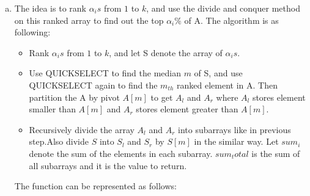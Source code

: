 \documentclass[11pt]{article}
\begin{document}
\begin{solution}
\begin{enumerate}[(a)]
    \item
    The idea is to rank $\alpha_is$ from $1$ to $k$, and use the divide and conquer method on this ranked array to find out the top $\alpha_i\%$ of A. The algorithm is as following:
    \begin{itemize}
        \item Rank $\alpha_is$ from $1$ to $k$, and let S denote the array of $\alpha_is$.
        \item Use QUICKSELECT to find the median $m$ of S, and use QUICKSELECT again to find the $m_{th}$ ranked element in A. Then partition the A by pivot $A[m]$ to get $A_l$ and $A_r$ where $A_l$ stores element smaller than $A[m]$ and $A_r$ stores element greater than $A[m]$.
        \item Recursively divide the array $A_l$ and $A_r$ into subarrays like in previous step.Also divide $S$ into $S_l$ and $S_r$ by $S[m]$ in the similar way. Let $sum_i$ denote the sum of the elements in each subarray. $sum_total$ is the sum of all subarrays and it is the value to return.
    \end{itemize}
    The function can be represented as follows:
    \begin{quote}
        \newline
    \end{quote}
    

\end{enumerate}
\end{solution}
\end{document}
